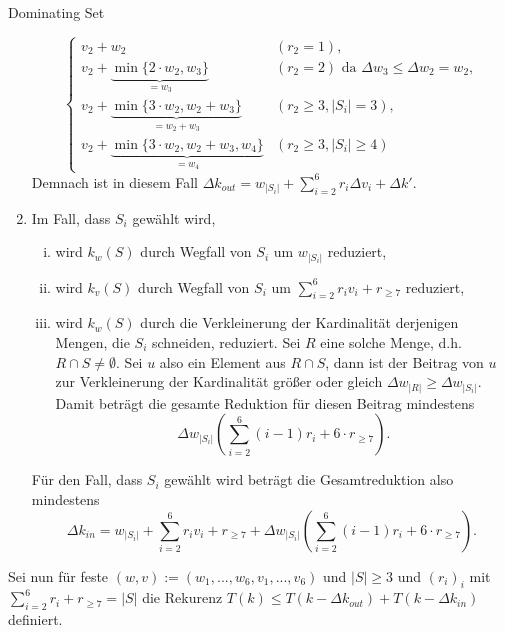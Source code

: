 \begin{section}{Dominating Set}
\begin{enumerate}[(1)]
\[\begin{cases}
             v_2 + w_2 & (r_2 = 1), \\
             v_2 + \underbrace{\min\{2\cdot w_2, w_3\}}_{= w_3} & (r_2 = 2) \text{ da } \Delta w_3 \leq \Delta w_2 = w_2,\\
             v_2 + \underbrace{\min\{ 3\cdot w_2, w_2+w_3 \}}_{= w_2 + w_3} & (r_2 \geq 3, |S_i| = 3), \\
             v_2 + \underbrace{\min\{3\cdot w_2, w_2+w_3,w_4\}}_{= w_4} & (r_2 \geq 3, |S_i| \geq 4)
           \end{cases}
          \]
          Demnach ist in diesem Fall \(\Delta k_{out} = w_{|S_i|} + \sum_{i=2}^6 r_i \Delta v_i + \Delta k'\).
   \item Im Fall, dass \(S_i\) gewählt wird,
          \begin{enumerate}[(i)]
           \item wird \(k_w(S)\) durch Wegfall von \(S_i\) um \(w_{|S_i|}\) reduziert,
           \item wird \(k_v(S)\) durch Wegfall von \(S_i\) um \(\sum_{i=2}^6 r_iv_i + r_{\geq 7}\) reduziert,
           \item wird \(k_w(S)\) durch die Verkleinerung der Kardinalität derjenigen Mengen, die \(S_i\) schneiden, reduziert. Sei \(R\) eine solche Menge, d.h. \(R \cap S \neq \emptyset\). Sei \(u\) also ein Element aus \(R \cap S\), dann ist der Beitrag von \(u\) zur Verkleinerung der Kardinalität größer oder gleich \(\Delta w_{|R|} \geq \Delta w_{|S_i|}\). Damit beträgt die gesamte Reduktion für diesen Beitrag mindestens \[ \Delta w_{|S_i|} \left( \sum_{i=2}^6 (i-1)r_i + 6 \cdot r_{\geq 7} \right). \]
          \end{enumerate}
         Für den Fall, dass \(S_i\) gewählt wird beträgt die Gesamtreduktion also mindestens
         \[
           \Delta k_{in} = w_{|S_i|} + \sum_{i=2}^6 r_iv_i + r_{\geq 7} + \Delta w_{|S_i|} \left( \sum_{i=2}^6 (i-1)r_i + 6 \cdot r_{\geq 7} \right).
         \]
  \end{enumerate}

  Sei nun für feste \( (w,v) := (w_1,...,w_6,v_1,...,v_6)\) und \(|S| \geq 3\) und \((r_i)_i\) mit \(\sum_{i=2}^6 r_i + r_{\geq 7} = |S|\) die Rekurenz \(T(k) \leq T(k-\Delta k_{out}) + T(k - \Delta k_{in})\) definiert.


\end{section}
